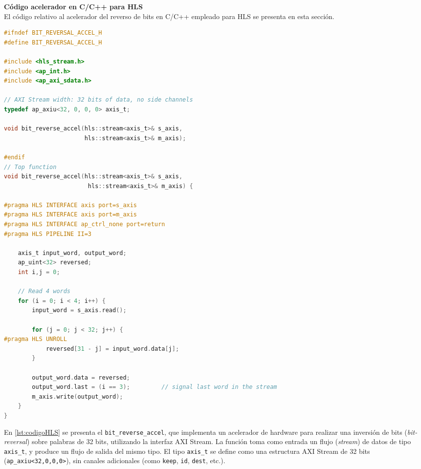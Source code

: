 \begin{adjustwidth}{1.5cm}{}
\label{it2:codigoRTL}
\textbf{Código acelerador en C/C++ para HLS} \vspace{0.25cm} \\
El código relativo al acelerador del reverso de bits en C/C++ empleado para HLS se presenta en esta sección.

\begin{lstlisting}[language=c,frame=single,caption={Código fuente en C/C++ del acelerador reverso de bits},showstringspaces=false,label=lst:codigoHLS]
#ifndef BIT_REVERSAL_ACCEL_H
#define BIT_REVERSAL_ACCEL_H

#include <hls_stream.h>
#include <ap_int.h>
#include <ap_axi_sdata.h>

// AXI Stream width: 32 bits of data, no side channels
typedef ap_axiu<32, 0, 0, 0> axis_t;

void bit_reverse_accel(hls::stream<axis_t>& s_axis,
                       hls::stream<axis_t>& m_axis);

#endif
// Top function
void bit_reverse_accel(hls::stream<axis_t>& s_axis,
						hls::stream<axis_t>& m_axis) {

#pragma HLS INTERFACE axis port=s_axis
#pragma HLS INTERFACE axis port=m_axis
#pragma HLS INTERFACE ap_ctrl_none port=return
#pragma HLS PIPELINE II=3

    axis_t input_word, output_word;
    ap_uint<32> reversed;
    int i,j = 0;

    // Read 4 words
    for (i = 0; i < 4; i++) {
        input_word = s_axis.read();

        for (j = 0; j < 32; j++) {
#pragma HLS UNROLL
			reversed[31 - j] = input_word.data[j];
		}

        output_word.data = reversed;
        output_word.last = (i == 3);         // signal last word in the stream
        m_axis.write(output_word);
    }
}
\end{lstlisting}

En \ref{lst:codigoHLS} se presenta el \texttt{bit\_reverse\_accel}, que implementa un acelerador de hardware para realizar una inversión de bits (\emph{bit-reversal}) sobre palabras de 32 bits, utilizando la interfaz AXI Stream. La función toma como entrada un flujo (\emph{stream}) de datos de tipo \texttt{axis\_t}, y produce un flujo de salida del mismo tipo. El tipo \texttt{axis\_t} se define como una estructura AXI Stream de 32 bits (\texttt{ap\_axiu<32,0,0,0>}), sin canales adicionales (como \texttt{keep}, \texttt{id}, \texttt{dest}, etc.).


\end{adjustwidth}
